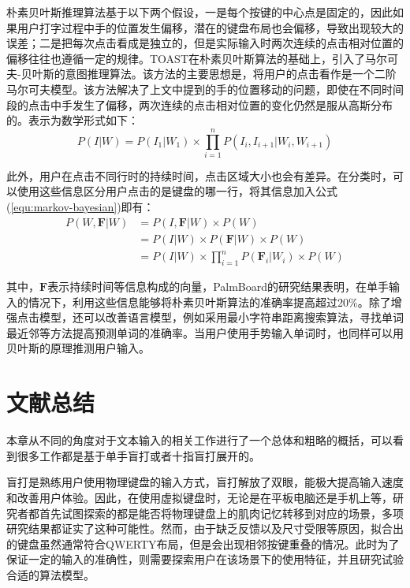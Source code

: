 朴素贝叶斯推理算法基于以下两个假设，一是每个按键的中心点是固定的，因此如果用户打字过程中手的位置发生偏移，潜在的键盘布局也会偏移，导致出现较大的误差；二是把每次点击看成是独立的，但是实际输入时两次连续的点击相对位置的偏移往往也遵循一定的规律\cite{2018shitoast}。TOAST\cite{2018shitoast}在朴素贝叶斯算法的基础上，引入了马尔可夫-贝叶斯的意图推理算法。该方法的主要思想是，将用户的点击看作是一个二阶马尔可夫模型。该方法解决了上文中提到的手的位置移动的问题，即使在不同时间段的点击中手发生了偏移，两次连续的点击相对位置的变化仍然是服从高斯分布的。表示为数学形式如下：
\begin{equation}
    \label{equ:markov-bayesian}
    P(I|W) = P(I_1|W_1) \times \prod_{i=1}^{n}P(I_i, I_{i+1}|W_i, W_{i+1})
\end{equation}

此外，用户在点击不同行时的持续时间，点击区域大小也会有差异。在分类时，可以使用这些信息区分用户点击的是键盘的哪一行，将其信息加入公式(\ref{equ:markov-bayesian})即有：
\begin{equation}
    \begin{aligned}
        P(W, \textbf{F}|W) &= P(I,\textbf{F}|W) \times P(W) \\ 
        &= P(I|W) \times P(\textbf{F}|W) \times P(W) \\ &= P(I|W) \times \prod_{i=1}^{n}P(\textbf{F}_{i}|W_{i}) \times P(W)
    \end{aligned} 
\end{equation}

其中，$\textbf{F}$表示持续时间等信息构成的向量，PalmBoard\cite{palmboard2020}的研究结果表明，在单手输入的情况下，利用这些信息能够将朴素贝叶斯算法的准确率提高超过20\%。除了增强点击模型，还可以改善语言模型，例如采用最小字符串距离搜索算法\cite{tinwala2010eyes}，寻找单词最近邻\cite{bunke1993fast}等方法提高预测单词的准确率。当用户使用手势输入单词时，也同样可以用贝叶斯的原理推测用户输入\cite{zhai2012word}。

\section{文献总结}
本章从不同的角度对于文本输入的相关工作进行了一个总体和粗略的概括，可以看到很多工作都是基于单手盲打或者十指盲打展开的。

盲打是熟练用户使用物理键盘的输入方式，盲打解放了双眼，能极大提高输入速度和改善用户体验。因此，在使用虚拟键盘时，无论是在平板电脑还是手机上等，研究者都首先试图探索的都是能否将物理键盘上的肌肉记忆转移到对应的场景，多项研究结果都证实了这种可能性\cite{2017blindtype}\cite{2018shitoast}\cite{zhu2018typing}\cite{palmboard2020}。然而，由于缺乏反馈以及尺寸受限等原因，拟合出的键盘虽然通常符合QWERTY布局，但是会出现相邻按键重叠的情况。此时为了保证一定的输入的准确性，则需要探索用户在该场景下的使用特征，并且研究试验合适的算法模型。

